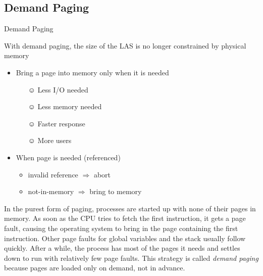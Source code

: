 \subsection{Demand Paging}

\begin{frame}{Demand Paging}
  \begin{iblock}{With demand paging, the size of the LAS is no longer constrained by
      physical memory}
    \begin{itemize}
    \item Bring a page into memory only when it is needed
      \begin{itemize}
      \item[☺] Less I/O needed
      \item[☺] Less memory needed
      \item[☺] Faster response
      \item[☺] More users
      \end{itemize}
    \item When page is needed (referenced)
      \begin{itemize}
      \item invalid reference $\Rightarrow$ abort
      \item not-in-memory $\Rightarrow$ bring to memory
      \end{itemize}
    \end{itemize}
  \end{iblock}
\end{frame}

In the purest form of paging, processes are started up with none of their pages in
memory. As soon as the CPU tries to fetch the first instruction, it gets a page fault,
causing the operating system to bring in the page containing the first instruction. Other
page faults for global variables and the stack usually follow quickly. After a while, the
process has most of the pages it needs and settles down to run with relatively few page
faults. This strategy is called \emph{demand paging} because pages are loaded only on
demand, not in advance.


